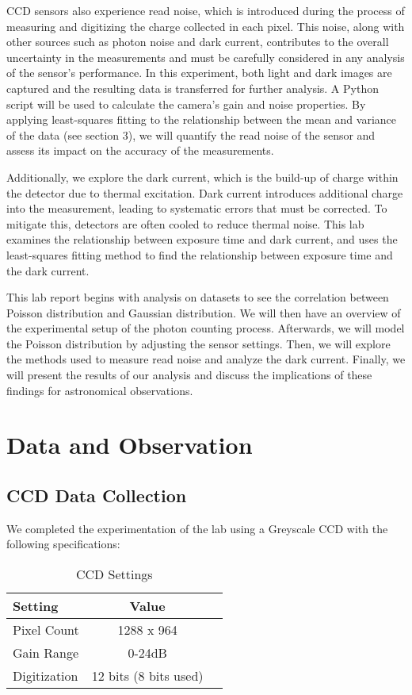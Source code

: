 \documentclass[10pt, preprint]{aastex}
\begin{document}
CCD sensors also experience read noise, which is introduced during the process of measuring and digitizing the charge collected in each pixel. This noise, along with other sources such as photon noise and dark current, contributes to the overall uncertainty in the measurements and must be carefully considered in any analysis of the sensor's performance. In this experiment, both light and dark images are captured and the resulting data is transferred for further analysis. A Python script will be used to calculate the camera's gain and noise properties. By applying least-squares fitting to the relationship between the mean and variance of the data (see section 3), we will quantify the read noise of the sensor and assess its impact on the accuracy of the measurements.

Additionally, we explore the dark current, which is the build-up of charge within the detector due to thermal excitation. Dark current introduces additional charge into the measurement, leading to systematic errors that must be corrected. To mitigate this, detectors are often cooled to reduce thermal noise. This lab examines the relationship between exposure time and dark current, and uses the least-squares fitting method to find the relationship between exposure time and the dark current.

This lab report begins with analysis on datasets to see the correlation between Poisson distribution and Gaussian distribution. We will then have an overview of the experimental setup of the photon counting process. Afterwards, we will model the Poisson distribution by adjusting the sensor settings. Then, we will explore the methods used to measure read noise and analyze the dark current. Finally, we will present the results of our analysis and discuss the implications of these findings for astronomical observations.


\section{Data and Observation}
\label{sec:data}

\subsection{CCD Data Collection}

We completed the experimentation of the lab using a Greyscale CCD with the following specifications:

\begin{table}[H]
\centering
\begin{tabular}{lcr}
\hline
Setting & Value\\\hline
Pixel Count & 1288 x 964\\
Gain Range & 0-24dB\\
Digitization & 12 bits (8 bits used) \\
\end{tabular}
\caption{\label{table:CCDSettings}CCD Settings}
\end{table}
\end{document}
